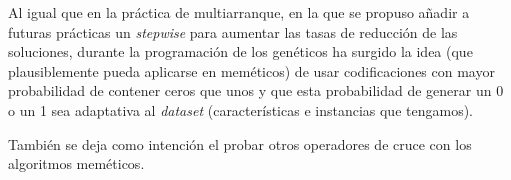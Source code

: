 \documentclass[a4paper,11pt]{article}
\begin{document}
  Al igual que en la práctica de multiarranque, en la que se propuso añadir a futuras prácticas un \textit{stepwise} para
  aumentar las tasas de reducción de las soluciones, durante la programación de los genéticos ha surgido la idea (que 
  plausiblemente pueda aplicarse en meméticos) de usar codificaciones con mayor probabilidad de contener ceros que unos y
  que esta probabilidad de generar un 0 o un 1 sea adaptativa al \textit{dataset} (características e instancias que tengamos).
  
  También se deja como intención el probar otros operadores de cruce con los algoritmos meméticos.
\end{document}
